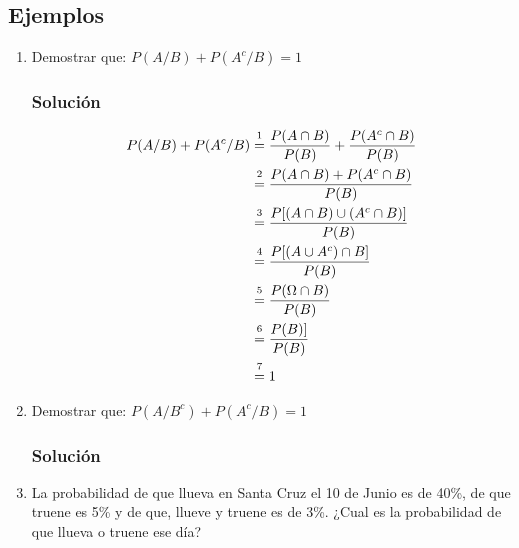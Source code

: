 \subsection{Ejemplos}
\begin{enumerate}
\item Demostrar que: $P(A/B)+P(A^c/B)=1$
\subsubsection{Solución}
\begin{align*}
P(A/B)+P(A^c/B) &\varstackrel{1}{=} \dfrac{P(A\cap B)}{P(B)} + \dfrac{P(A^c\cap B)}{P(B)} \\
  &\varstackrel{2}{=} \dfrac{P(A\cap B)+P(A^c\cap B)}{P(B)} \\
    &\varstackrel{3}{=} \dfrac{P[(A\cap B)\cup(A^c\cap B)]}{P(B)} \\
      &\varstackrel{4}{=} \dfrac{P[(A\cup A^c)\cap B]}{P(B)} \\
        &\varstackrel{5}{=} \dfrac{P(\Omega\cap B)}{P(B)} \\
           &\varstackrel{6}{=} \dfrac{P(B)]}{P(B)} \\
                 &\varstackrel{7}{=} 1 \\
\end{align*}
\item Demostrar que: $P(A/B^c)+P(A^c/B)=1$
\subsubsection{Solución}
\item La probabilidad de que llueva en Santa Cruz el 10 de Junio es de 40\%, de que truene es 5\% y de que, llueve y truene es de 3\%. ¿Cual es la probabilidad de que llueva o truene ese día?

\end{enumerate}
